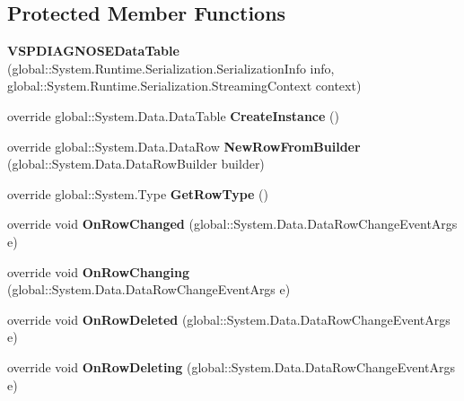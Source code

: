 \subsection*{Protected Member Functions}
\begin{CompactItemize}
\item 
\textbf{VSPDIAGNOSEDataTable} (global::System.Runtime.Serialization.SerializationInfo info, global::System.Runtime.Serialization.StreamingContext context)\label{class_automatic_medical_system_1_1_data_set1_1_1_v_s_p_d_i_a_g_n_o_s_e_data_table_20ba09264c74148b30e3276e8f266b8d}

\item 
override global::System.Data.DataTable \textbf{CreateInstance} ()\label{class_automatic_medical_system_1_1_data_set1_1_1_v_s_p_d_i_a_g_n_o_s_e_data_table_822f27b6dfd231bda5c0d421b5d403aa}

\item 
override global::System.Data.DataRow \textbf{NewRowFromBuilder} (global::System.Data.DataRowBuilder builder)\label{class_automatic_medical_system_1_1_data_set1_1_1_v_s_p_d_i_a_g_n_o_s_e_data_table_27fd8e09c7f3899811d074c3747aff9f}

\item 
override global::System.Type \textbf{GetRowType} ()\label{class_automatic_medical_system_1_1_data_set1_1_1_v_s_p_d_i_a_g_n_o_s_e_data_table_41985b00b27a43fa1060165501afaddf}

\item 
override void \textbf{OnRowChanged} (global::System.Data.DataRowChangeEventArgs e)\label{class_automatic_medical_system_1_1_data_set1_1_1_v_s_p_d_i_a_g_n_o_s_e_data_table_710084ad48d45b6733c5f5aedbd7ce0f}

\item 
override void \textbf{OnRowChanging} (global::System.Data.DataRowChangeEventArgs e)\label{class_automatic_medical_system_1_1_data_set1_1_1_v_s_p_d_i_a_g_n_o_s_e_data_table_677fc94abcb0fd972ea0d383bda52eb8}

\item 
override void \textbf{OnRowDeleted} (global::System.Data.DataRowChangeEventArgs e)\label{class_automatic_medical_system_1_1_data_set1_1_1_v_s_p_d_i_a_g_n_o_s_e_data_table_c295e9cc28f12a4948b96a39824afe0b}

\item 
override void \textbf{OnRowDeleting} (global::System.Data.DataRowChangeEventArgs e)\label{class_automatic_medical_system_1_1_data_set1_1_1_v_s_p_d_i_a_g_n_o_s_e_data_table_abf489ace6e3269c0bb27b9d89e0ec7f}

\end{CompactItemize}
